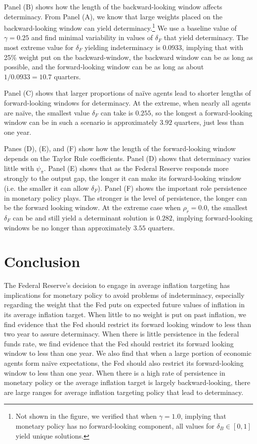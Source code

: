 \documentclass[english,authoryear,12pt]{elsarticle}
\begin{document}
Panel (B) shows how the length of the backward-looking window affects determinacy. From Panel (A), we know that large weights placed on the backward-looking window can yield determinacy.\footnote{Not shown in the figure, we verified that when $\gamma=1.0$, implying that monetary policy has no forward-looking component, all values for $\delta_B\in[0,1]$ yield unique solutions.} We use a baseline value of $\gamma=0.25$ and find minimal variability in values of $\delta_F$ that yield determinacy. The most extreme value for $\delta_F$ yielding indeterminacy is 0.0933, implying that with 25\% weight put on the backward-window, the backward window can be as long as possible, and the forward-looking window can be as long as about $1/0.0933 = 10.7$ quarters.

Panel (C) shows that larger proportions of na\"ive agents lead to shorter lengths of forward-looking windows for determinacy. At the extreme, when nearly all agents are na\"ive, the smallest value $\delta_F$ can take is $0.255$, so the longest a forward-looking window can be in such a scenario is approximately $3.92$ quarters, just less than one year.

Panes (D), (E), and (F) show how the length of the forward-looking window depends on the Taylor Rule coefficients. Panel (D) shows that determinacy varies little with $\psi_\pi$. Panel (E) shows that as the Federal Reserve responds more strongly to the output gap, the longer it can make its forward-looking window (i.e. the smaller it can allow $\delta_F$). Panel (F) shows the important role persistence in monetary policy plays. The stronger is the level of persistence, the longer can be the forward looking window. At the extreme case when $\rho_r=0.0$, the smallest $\delta_F$ can be and still yield a determinant solution is $0.282$, implying forward-looking windows be no longer than approximately $3.55$ quarters.

\section{Conclusion}

The Federal Reserve's decision to engage in average inflation targeting has implications for monetary policy to avoid problems of indeterminacy, especially regarding the weight that the Fed puts on expected future values of inflation in its average inflation target. When little to no weight is put on past inflation, we find evidence that the Fed should restrict its forward looking window to less than two year to assure determinacy. When there is little persistence in the federal funds rate, we find evidence that the Fed should restrict its forward looking window to less than one year. We also find that when a large portion of economic agents form na\"ive expectations, the Fed should also restrict its forward-looking window to less than one year. When there is a high rate of persistence in monetary policy or the average inflation target is largely backward-looking, there are large ranges for average inflation targeting policy that lead to determinacy.



\end{document}
